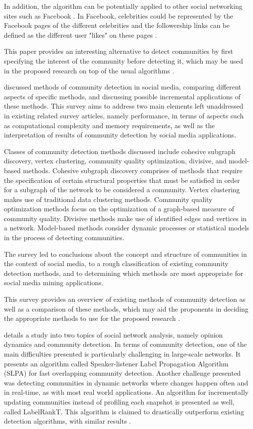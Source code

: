 In addition, the algorithm can be potentially applied to other social networking sites such as Facebook . In Facebook, celebrities could be represented by the Facebook pages of the different celebrities and the followership links can be defined as the different user "likes" on these pages \cite{Lim:2012:0}.

This paper provides an interesting alternative to detect communities by first specifying the interest of the community before detecting it, which may be used in the proposed research on top of the usual algorithms \cite{Lim:2012:1}.

 discussed methods of community detection in social media, comparing different aspects of specific methods, and discussing possible incremental applications of these methods. This survey aims to address two main elements left unaddressed in existing related survey articles, namely performance, in terms of aspects such as computational complexity and memory requirements, as well as the interpretation of results of community detection by social media applications.

Classes of community detection methods discussed include cohesive subgraph discovery, vertex clustering, community quality optimization, divisive, and model-based methods. Cohesive subgraph discovery comprises of methods that require the specification of certain structural properties that must be satisfied in order for a subgraph of the network to be considered a community. Vertex clustering makes use of traditional data clustering methods. Community quality optimization methods focus on the optimization of a graph-based measure of community quality. Divisive methods make use of identified edges and vertices in a network. Model-based methods consider dynamic processes or statistical models in the process of detecting communities.

The survey led to conclusions about the concept and structure of communities in the context of social media, to a rough classification of existing community detection methods, and to determining which methods are most appropriate for social media mining applications. 

This survey provides an overview of existing methods of community detection as well as a comparison of these methods, which may aid the proponents in deciding the appropriate methods to use for the proposed research \cite{Papadopoulos:2012}.

 details a study into two topics of social network analysis, namely opinion dynamics and community detection. In terms of community detection, one of the main difficulties presented is particularly challenging in large-scale networks. It presents an algorithm called Speaker-listener Label Propagation Algorithm (SLPA) for fast overlapping community detection. Another challenge presented was detecting communities in dynamic networks where changes happen often and in real-time, as with most real world applications. An algorithm for incrementally updating communities instead of profiling each snapshot is presented as well, called LabelRankT. This algorithm is claimed to drastically outperform existing detection algorithms, with similar results \cite{Xie:2012}. 

